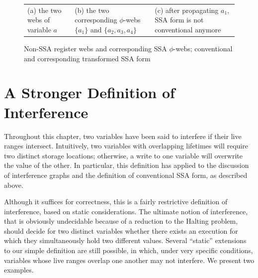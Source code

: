 \begin{figure}
\begin{tabular}{p{}p{}p{}}
(a) the two webs of variable $a$ & 
(b) the two corresponding $\phi$-webs $\{a_1\}$ and $\{a_2,a_3,a_4\}$ &
(c) after propagating $a_1$, SSA form is not conventional anymore
\end{tabular}
\caption{\label{fig:properties_and_flavors:conventional}Non-SSA register webs and corresponding SSA $\phi$-webs; conventional and corresponding transformed SSA form}
\end{figure}



\section{A Stronger Definition of Interference}

Throughout this chapter, two variables have been said to interfere
if their live ranges intersect. Intuitively, two variables with overlapping
lifetimes will require two distinct storage locations; otherwise, a write
to one variable will overwrite the value of the other. In particular,
this definition has applied to the discussion of interference graphs
and the definition of conventional SSA form, as described above.

Although it suffices
for correctness, this is a fairly restrictive definition of interference, based on static considerations. 
The ultimate notion of interference, that is obviously undecidable because of a reduction to the Halting problem, should decide for two distinct variables whether there exists an execution for which they simultaneously hold two different values. 
Several ``static'' extensions to our simple definition are still possible, in which,
under very specific conditions, variables whose live ranges overlap
one another may not interfere. 
We present two examples.


